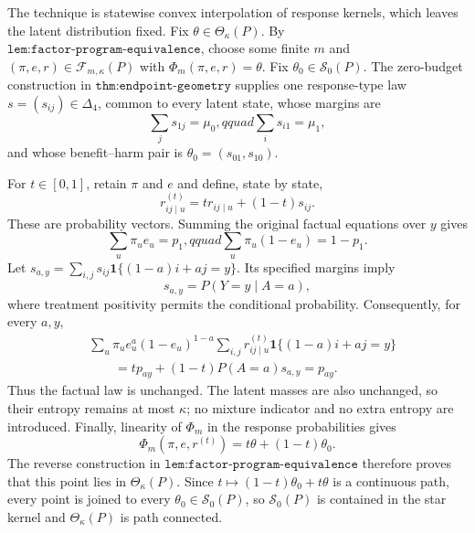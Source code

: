 The technique is statewise convex interpolation of response kernels, which leaves the latent distribution fixed.  Fix \(\theta\in\Theta_\kappa(P)\).  By \(\texttt{lem:factor-program-equivalence}\), choose some finite \(m\) and \((\pi,e,r)\in\mathcal F_{m,\kappa}(P)\) with \(\Phi_m(\pi,e,r)=\theta\).  Fix \(\theta_0\in\mathcal S_0(P)\).  The zero-budget construction in \(\texttt{thm:endpoint-geometry}\) supplies one response-type law \(s=(s_{ij})\in\Delta_4\), common to every latent state, whose margins are
\[
 \sum_j s_{1j}=\mu_0,qquad \sum_i s_{i1}=\mu_1,
\]
and whose benefit--harm pair is \(\theta_0=(s_{01},s_{10})\).

For \(t\in[0,1]\), retain \(\pi\) and \(e\) and define, state by state,
\[
 r^{(t)}_{ij\mid u}=t r_{ij\mid u}+(1-t)s_{ij}.
\]
These are probability vectors.  Summing the original factual equations over \(y\) gives
\[
 \sum_u\pi_u e_u=p_1,qquad
 \sum_u\pi_u(1-e_u)=1-p_1.
\]
Let \(s_{a,y}=\sum_{i,j}s_{ij}\mathbf 1\{(1-a)i+aj=y\}\).  Its specified margins imply
\[
 s_{a,y}=P(Y=y\mid A=a),
\]
where treatment positivity permits the conditional probability.  Consequently, for every \(a,y\),
\[
 \begin{aligned}
 &\sum_u\pi_u e_u^a(1-e_u)^{1-a}
 \sum_{i,j}r^{(t)}_{ij\mid u}\mathbf 1\{(1-a)i+aj=y\}\\
 &\qquad=t p_{ay}+(1-t)P(A=a)s_{a,y}=p_{ay}.
 \end{aligned}
\]
Thus the factual law is unchanged.  The latent masses are also unchanged, so their entropy remains at most \(\kappa\); no mixture indicator and no extra entropy are introduced.  Finally, linearity of \(\Phi_m\) in the response probabilities gives
\[
 \Phi_m(\pi,e,r^{(t)})=t\theta+(1-t)\theta_0.
\]
The reverse construction in \(\texttt{lem:factor-program-equivalence}\) therefore proves that this point lies in \(\Theta_\kappa(P)\).  Since \(t\mapsto(1-t)\theta_0+t\theta\) is a continuous path, every point is joined to every \(\theta_0\in\mathcal S_0(P)\), so \(\mathcal S_0(P)\) is contained in the star kernel and \(\Theta_\kappa(P)\) is path connected.